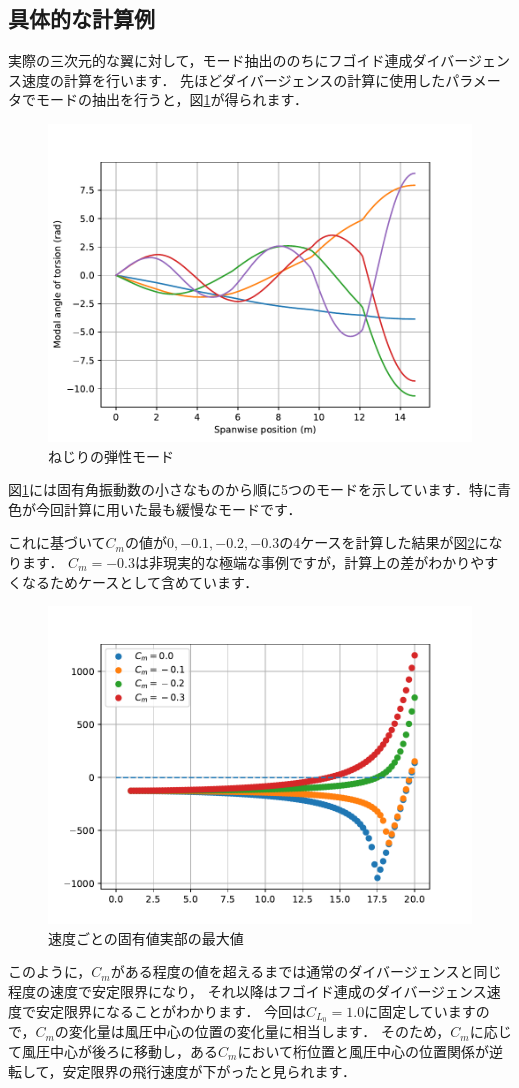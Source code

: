 \documentclass{jarticle}
\begin{document}
\subsection{具体的な計算例}

実際の三次元的な翼に対して，モード抽出ののちにフゴイド連成ダイバージェンス速度の計算を行います．
先ほどダイバージェンスの計算に使用したパラメータでモードの抽出を行うと，図\ref{mode}が得られます．
\begin{figure}[H]
    \centering
    \includegraphics[width=0.7\linewidth]{image/theta_mode.pdf}
    \caption{ねじりの弾性モード}
    \label{mode}
\end{figure}
図\ref{mode}には固有角振動数の小さなものから順に5つのモードを示しています．特に青色が今回計算に用いた最も緩慢なモードです．

これに基づいて$C_m$の値が$0,-0.1,-0.2,-0.3$の4ケースを計算した結果が図\ref{eigen2}になります．
$C_m=-0.3$は非現実的な極端な事例ですが，計算上の差がわかりやすくなるためケースとして含めています．
\begin{figure}[H]
    \centering
    \includegraphics[width=0.7\linewidth]{image/eigenplot.pdf}
    \caption{速度ごとの固有値実部の最大値}
    \label{eigen2}
\end{figure}
このように，$C_m$がある程度の値を超えるまでは通常のダイバージェンスと同じ程度の速度で安定限界になり，
それ以降はフゴイド連成のダイバージェンス速度で安定限界になることがわかります．
今回は$C_{L_0}=1.0$に固定していますので，$C_m$の変化量は風圧中心の位置の変化量に相当します．
そのため，$C_m$に応じて風圧中心が後ろに移動し，ある$C_m$において桁位置と風圧中心の位置関係が逆転して，安定限界の飛行速度が下がったと見られます．
\end{document}
